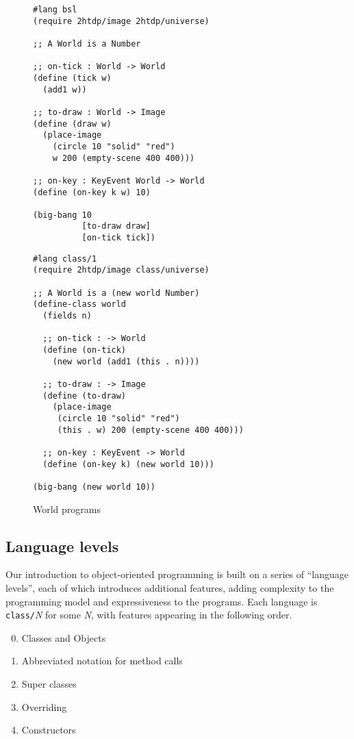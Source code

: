 \documentclass[submission,copyright]{eptcs}
\begin{document}
\begin{figure}
\begin{minipage}[t]{3.4in}
\begin{verbatim}
#lang bsl
(require 2htdp/image 2htdp/universe)

;; A World is a Number

;; on-tick : World -> World
(define (tick w)
  (add1 w))

;; to-draw : World -> Image
(define (draw w)
  (place-image 
    (circle 10 "solid" "red")
    w 200 (empty-scene 400 400)))

;; on-key : KeyEvent World -> World
(define (on-key k w) 10)

(big-bang 10
          [to-draw draw]
          [on-tick tick])
\end{verbatim}
\end{minipage}
\begin{minipage}[t]{3in}
\begin{verbatim}
#lang class/1
(require 2htdp/image class/universe)

;; A World is a (new world Number)
(define-class world
  (fields n)

  ;; on-tick : -> World
  (define (on-tick)
    (new world (add1 (this . n))))

  ;; to-draw : -> Image
  (define (to-draw) 
    (place-image 
     (circle 10 "solid" "red")
     (this . w) 200 (empty-scene 400 400)))

  ;; on-key : KeyEvent -> World
  (define (on-key k) (new world 10)))
  
(big-bang (new world 10))
\end{verbatim}
\end{minipage}
\caption{World programs}
\label{fig:world}
\end{figure}


\subsection{Language levels}

Our introduction to object-oriented programming is built on a series
of ``language levels'', each of which introduces additional features,
adding complexity to the programming model and expressiveness to the
programs.  Each language is  \texttt{class/}\textit{N}
for some \textit{N}, with features appearing in the following order.
\begin{enumerate}
  \setcounter{enumi}{-1}
\item Classes and Objects
\item Abbreviated notation for method calls
\item Super classes
\item Overriding
\item Constructors
\end{enumerate}
\end{document}

